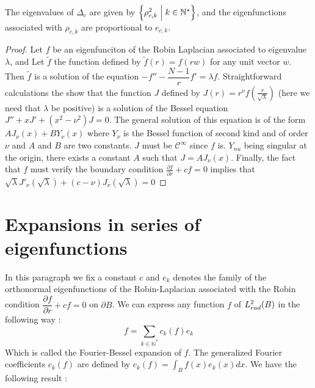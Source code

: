 \documentclass[11pt,a4paper]{article}
\begin{document}
\begin{Prop} The eigenvalues of $\Delta_c$  are given by $\left\{\rho_{c,k}^2\mathrel{}\middle|\mathrel{}k\in \mathbb{N}^*\right\}$, and the eigenfunctions associated with $\rho_{c,k}$ are proportional to $e_{c,k}$. 
\begin{proof}
Let $f$ be an eigenfunciton of the Robin Laplacian associated to eigenvalue $\lambda$, and Let $\tilde{f}$ the function defined by $\tilde{f}(r) = f(rw)$ for any unit vector $w$. Then $\tilde{f}$ is a solution of the equation $- f'' - \dfrac{N-1}{r}f' = \lambda f$. Straightforward calculations the show that the function $J$ defined by $J(r) = r^\nu f(\frac{r}{\sqrt{\lambda}})$ (here we need that $\lambda$ be positive) is a solution of the Bessel equation $J'' + xJ' + (x^2 - \nu^2)J = 0$. The general solution of this equation is of the form $A J_\nu(x) + B Y_\nu(x)$ where $Y_\nu$ is the Bessel function of second kind and of order $\nu$ and $A$ and $B$ are two constants. $J$ must be $\mathcal{C^\infty}$ since $f$ is. $Y_{nu}$ being singular at the origin, there exists a constant $A$ such that $J = A J_\nu(x)$. Finally, the fact that $f$ must verify the boundary condition $\frac{\partial f}{\partial r} + c f = 0$ implies that $\sqrt{\lambda}J'_\nu(\sqrt{\lambda}) + (c - \nu)J_\nu(\sqrt{\lambda}) =0$ 
\end{proof}
\end{Prop}


\section{Expansions in series of eigenfunctions}

In this paragraph we fix a constant $c$ and $e_{k}$ denotes the family of the orthonormal eigenfunctions of the Robin-Laplacian associated with the Robin condition $\dfrac{\partial f}{\partial r} + c f = 0$ on $\partial B$. 
We can express any function $f$ of $L^2_{rad}(B)$ in the following way : 
\[f = \sum_{k\in \mathbb{N}^*}c_k(f)e_{k}\]
Which is called the Fourier-Bessel expansion of $f$. The generalized Fourier coefficients $c_k(f)$ are defined by $c_k(f) = \displaystyle \int_B f(x)e_{k}(x) dx$. We have the following result : 
\end{document}

